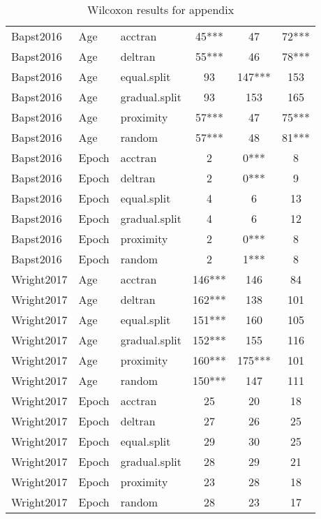\begin{table}[!htbp]
\begin{tabular}{lllccc}
  Bapst2016 & Age & acctran & 45*** & 47 & 72*** \\ 
  Bapst2016 & Age & deltran & 55*** & 46 & 78*** \\ 
  Bapst2016 & Age & equal.split & 93 & 147*** & 153 \\ 
  Bapst2016 & Age & gradual.split & 93 & 153 & 165 \\ 
  Bapst2016 & Age & proximity & 57*** & 47 & 75*** \\ 
  Bapst2016 & Age & random & 57*** & 48 & 81*** \\ 
  Bapst2016 & Epoch & acctran & 2 & 0*** & 8 \\ 
  Bapst2016 & Epoch & deltran & 2 & 0*** & 9 \\ 
  Bapst2016 & Epoch & equal.split & 4 & 6 & 13 \\ 
  Bapst2016 & Epoch & gradual.split & 4 & 6 & 12 \\ 
  Bapst2016 & Epoch & proximity & 2 & 0*** & 8 \\ 
  Bapst2016 & Epoch & random & 2 & 1*** & 8 \\ 
  Wright2017 & Age & acctran & 146*** & 146 & 84 \\ 
  Wright2017 & Age & deltran & 162*** & 138 & 101 \\ 
  Wright2017 & Age & equal.split & 151*** & 160 & 105 \\ 
  Wright2017 & Age & gradual.split & 152*** & 155 & 116 \\ 
  Wright2017 & Age & proximity & 160*** & 175*** & 101 \\ 
  Wright2017 & Age & random & 150*** & 147 & 111 \\ 
  Wright2017 & Epoch & acctran & 25 & 20 & 18 \\ 
  Wright2017 & Epoch & deltran & 27 & 26 & 25 \\ 
  Wright2017 & Epoch & equal.split & 29 & 30 & 25 \\ 
  Wright2017 & Epoch & gradual.split & 28 & 29 & 21 \\ 
  Wright2017 & Epoch & proximity & 23 & 28 & 18 \\ 
  Wright2017 & Epoch & random & 28 & 23 & 17 \\ 
   \hline
\end{tabular}
\caption{Wilcoxon results for appendix} 
\end{table}
